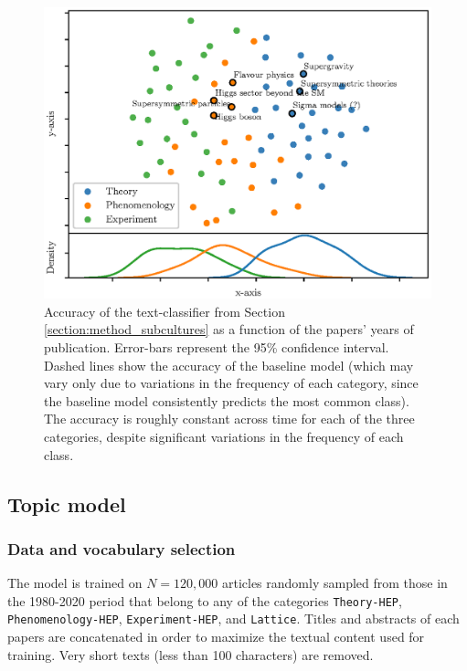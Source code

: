 \documentclass[smallextended]{svjour3}
\begin{document}
\begin{figure}
    \centering
    \includegraphics{Fig8.eps}
    \caption{Accuracy of the text-classifier from Section \ref{section:method_subcultures} as a function of the papers' years of publication. Error-bars represent the 95\% confidence interval. Dashed lines show the accuracy of the baseline model (which may vary only due to variations in the frequency of each category, since the baseline model consistently predicts the most common class). The accuracy is roughly constant across time for each of the three categories, despite significant variations in the frequency of each class.}
    \label{fig:stability}
\end{figure}



\subsection{Topic model}


\subsubsection{\label{appendix:data_selection}Data and vocabulary selection}

The model is trained on $N=120,000$ articles randomly sampled from those in the 1980-2020 period that belong to any of the categories \texttt{Theory-HEP}, \texttt{Phenomenology-HEP}, \texttt{Experiment-HEP}, and \texttt{Lattice}. Titles and abstracts of each papers are concatenated in order to maximize the textual content used for training. Very short texts (less than 100 characters) are removed.
\end{document}

